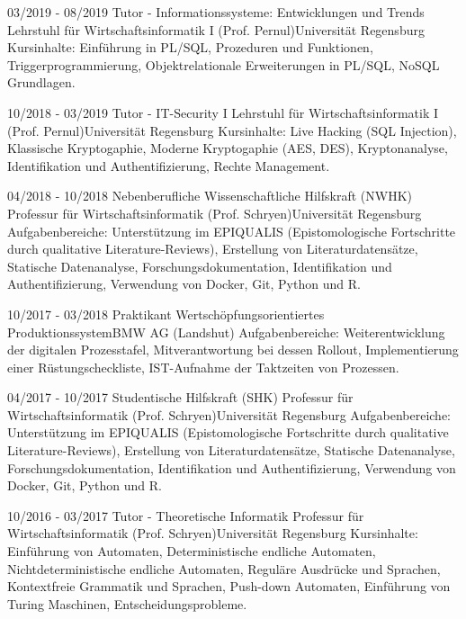\cvevent
{03/2019 - 08/2019}
{Tutor - Informationssysteme: Entwicklungen und Trends}
{Lehrstuhl für Wirtschaftsinformatik I (Prof. Pernul)\newline Universität Regensburg}
{Kursinhalte: Einführung in PL/SQL, Prozeduren und Funktionen, Triggerprogrammierung, Objektrelationale Erweiterungen in PL/SQL, NoSQL Grundlagen.}
\vfill\null
\vfill\null

\cvevent
{10/2018 - 03/2019}
{Tutor - IT-Security I}
{Lehrstuhl für Wirtschaftsinformatik I (Prof. Pernul)\newline Universität Regensburg}
{Kursinhalte: Live Hacking (SQL Injection), Klassische Kryptogaphie, Moderne Kryptogaphie (AES, DES), Kryptonanalyse, Identifikation und Authentifizierung, Rechte Management.}
\vfill\null

\cvevent
{04/2018 - 10/2018}
{Nebenberufliche Wissenschaftliche Hilfskraft (NWHK)}
{Professur für Wirtschaftsinformatik (Prof. Schryen)\newline Universität Regensburg}
{Aufgabenbereiche: Unterstützung im EPIQUALIS (Epistomologische Fortschritte durch qualitative Literature-Reviews), Erstellung von Literaturdatensätze, Statische Datenanalyse, Forschungsdokumentation, Identifikation und Authentifizierung, Verwendung von Docker, Git, Python und R.}
\vfill\null

\cvevent
{10/2017 - 03/2018}
{Praktikant}
{Wertschöpfungsorientiertes Produktionssystem\newline BMW AG (Landshut)}
{Aufgabenbereiche: Weiterentwicklung der digitalen Prozesstafel, Mitverantwortung bei dessen Rollout, Implementierung einer Rüstungscheckliste, IST-Aufnahme der Taktzeiten von Prozessen.}
\vfill\null

\cvevent
{04/2017 - 10/2017}
{Studentische Hilfskraft (SHK)}
{Professur für Wirtschaftsinformatik (Prof. Schryen)\newline Universität Regensburg}
{Aufgabenbereiche: Unterstützung im EPIQUALIS (Epistomologische Fortschritte durch qualitative Literature-Reviews), Erstellung von Literaturdatensätze, Statische Datenanalyse, Forschungsdokumentation, Identifikation und Authentifizierung, Verwendung von Docker, Git, Python und R.}
\vfill\null

\cvevent
{10/2016 - 03/2017}
{Tutor - Theoretische Informatik}
{Professur für Wirtschaftsinformatik (Prof. Schryen)\newline Universität Regensburg}
{Kursinhalte: Einführung von Automaten, Deterministische endliche Automaten, Nichtdeterministische endliche Automaten, Reguläre Ausdrücke und Sprachen, Kontextfreie Grammatik und Sprachen, Push-down Automaten, Einführung von Turing Maschinen, Entscheidungsprobleme.}
\vfill\null

